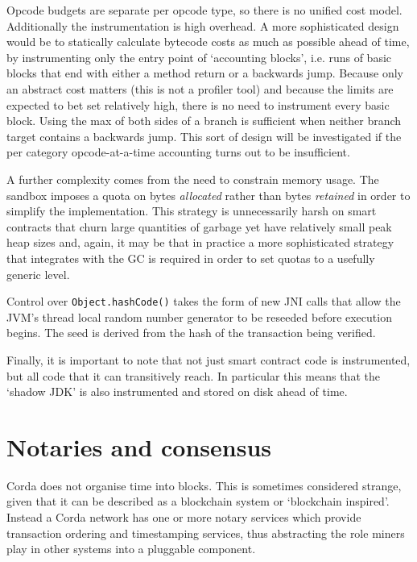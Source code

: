 \documentclass{article}
\begin{document}
Opcode budgets are separate per opcode type, so there is no unified cost model. Additionally the instrumentation is high
overhead. A more sophisticated design would be to statically calculate bytecode costs as much as possible ahead of time,
by instrumenting only the entry point of `accounting blocks', i.e. runs of basic blocks that end with either a method return
or a backwards jump. Because only an abstract cost matters (this is not a profiler tool) and because the limits are expected
to bet set relatively high, there is no need to instrument every basic block. Using the max of both sides of a branch is
sufficient when neither branch target contains a backwards jump. This sort of design will be investigated if the per category
opcode-at-a-time accounting turns out to be insufficient.

A further complexity comes from the need to constrain memory usage. The sandbox imposes a quota on bytes \emph{allocated}
rather than bytes \emph{retained} in order to simplify the implementation. This strategy is unnecessarily harsh on smart
contracts that churn large quantities of garbage yet have relatively small peak heap sizes and, again, it may be that
in practice a more sophisticated strategy that integrates with the GC is required in order to set quotas to a usefully
generic level.

Control over \texttt{Object.hashCode()} takes the form of new JNI calls that allow the JVM's thread local random number
generator to be reseeded before execution begins. The seed is derived from the hash of the transaction being verified.

Finally, it is important to note that not just smart contract code is instrumented, but all code that it can transitively
reach. In particular this means that the `shadow JDK' is also instrumented and stored on disk ahead of time.

\section{Notaries and consensus}\label{sec:notaries}

Corda does not organise time into blocks. This is sometimes considered strange, given that it can be described as a
blockchain system or `blockchain inspired'. Instead a Corda network has one or more notary services which provide
transaction ordering and timestamping services, thus abstracting the role miners play in other systems into a pluggable
component.
\end{document}
